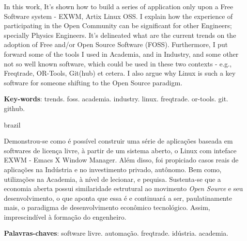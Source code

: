 \documentclass[
12pt,				%
openright,			%
oneside,			%
a4paper,			%
brazil,				%
english,			%
]{abntex2}
\begin{document}
\setlength{\absparsep}{18pt} %
\begin{resumo}
  In this work, It's shown how to build a series of application only upon a Free Software system - EXWM, Artix Linux OSS. I explain how the experience of participating in the Open Community can be significant for other Engineers; specially Physics Engineers. It's delineated what are the current trends on the adoption of Free and/or Open Source Software (FOSS). Furthermore, I put forward some of the tools I used in Academia, and in Industry, and some other not so well known software, which could be used in these two contexts - e.g., Freqtrade, OR-Tools, Git(hub) et cetera. I also argue why Linux is such a key software for someone shifting to the Open Source paradigm.
  
 \textbf{Key-words}: trends. foss. academia. industry. linux. freqtrade. or-tools. git. github.
\end{resumo}

\begin{resumo}[Resumo]
 \begin{otherlanguage*}{brazil}

  Demonstrou-se como é possível construir uma série de aplicações
  baseada em softwares de licença livre, à partir de um sistema
  aberto, o Linux com inteface EXWM - Emacs X Window Manager. Além
  disso, foi propiciado casos reais de aplicações na Indústria e no
  investimento privado, autônomo. Bem como, utilizações na Academia,
  à nível de lecionar, e pequisa. Sustenta-se que a economia aberta
  possui similaridade estrutural ao movimento \textit{Open Source} e
  seu desenvolvimento, o que aponta que essa é e continuará a ser,
  paulatinamente mais, o paradigma de desenvolvimento econômico
  tecnológico. Assim, imprescindível à formação do engenheiro.
  
   \vspace{\onelineskip}
  \noindent
  \textbf{Palavras-chaves}: software livre. automação. freqtrade. idústria. academia.
 \end{otherlanguage*}
\end{resumo}

\listoffigures*
\cleardoublepage

\end{document}
